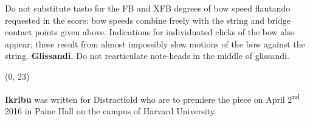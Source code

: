 \documentclass[10pt]{article}
\begin{document}
\begin{textblock}{23}
Do not substitute tasto for the FB and XFB degrees of bow speed flautando
requested in the score: bow speeds combine freely with the string and bridge
contact points given above. Indications for individuated clicks of the bow also
appear; these result from almost impossibly slow motions of the bow against the
string. \textbf{Glissandi.} Do not rearticulate note-heads in the middle of
glissandi.

\end{textblock}

\begin{textblock}{23}(0, 23)

\textbf{Ikribu} was written for Distractfold who are to premiere the piece on
April 2\textsuperscript{nd} 2016 in Paine Hall on the campus of Harvard
University.

\end{textblock}
\end{document}
